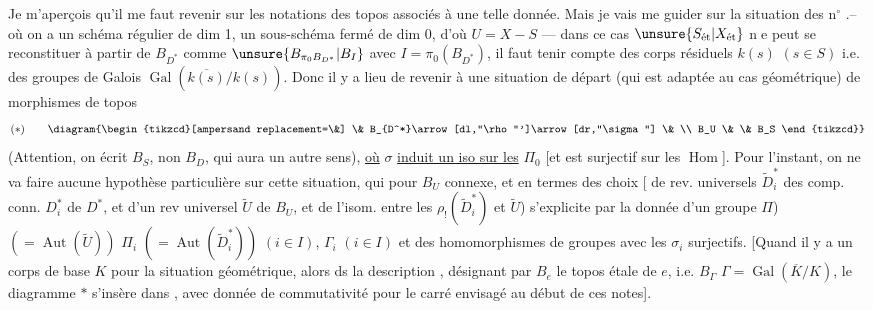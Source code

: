 Je m'aperçois qu'il me faut revenir sur les notations des   topos associés à une telle donnée. Mais je vais me guider sur la situation des n$^\circ$ .-- où on a un schéma régulier  de dim 1, un sous-schéma fermé  de dim 0, d'où $U=X-S$ --- dans ce cas  $\unsure{S_{\text{ét}}|X_{\text{ét}}}$ \textcircled{ne} peut se reconstituer à partir de $B_{D^*}$ comme $\unsure{B_{\pi_0 B_{D^*}}|B_I}$
avec $I=\pi_0(B_{D^*})$, il faut tenir compte des corps résiduels $k(s)$ $(s\in S)$ i.e. des groupes de Galois $\operatorname{Gal}(\overline{k(s)}/k(s))$. Donc il y a lieu de revenir à une situation de départ (qui est adaptée au cas géométrique) de morphismes de topos 
\[
 (*)\qquad
 \diagram{\begin{tikzcd}[ampersand replacement=\&]
 \& B_{D^*}\arrow[dl,"\rho"']\arrow[dr,"\sigma"] \& \\
 B_U \& \& B_S
 \end{tikzcd}}
\]
(Attention, on écrit $B_S$, non $B_D$, qui aura un autre sens), \uline{où} $\sigma$ \uline{induit un iso sur les} $\Pi_0$ [et est surjectif sur les $\operatorname{Hom}$]. Pour l'instant, on ne va faire aucune hypothèse particulière sur cette situation, qui pour $B_U$ connexe, et en termes des choix
[ de rev. universels $\widetilde D_i^*$ des comp. conn. $D_i^*$ de $D^*$, et d'un rev universel $\widetilde U$ de $B_U$, et de l'isom. entre les $\rho_!(\widetilde D_i^*)$ et $\widetilde U$) s'explicite par la donnée d'un groupe  $\Pi$) $(=\operatorname{Aut}(\widetilde U))$   $\Pi_i$ $(=\operatorname{Aut}(\widetilde D_i^*))$  $(i\in I)$, $\Gamma_i$ $(i\in I)$
et des homomorphismes de groupes
avec les $\sigma_i$ surjectifs. 
[Quand il y a un corps de base $K$ pour la situation géométrique, alors ds la description ,  désignant par $B_e$ le topos étale  de $e$, i.e. $B_\Gamma$  $\Gamma=\operatorname{Gal}(\overline K/K)$, le diagramme $*$ s'insère dans
,
avec donnée de commutativité pour le carré envisagé au début de ces notes].


